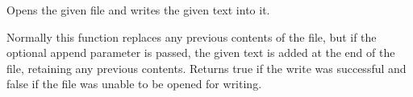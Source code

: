 Opens the given file and writes the given text into it. 

Normally this function replaces any previous contents of the file, but if the optional \textquotesingle{}append\textquotesingle{} parameter is passed, the given text is added at the end of the file, retaining any previous contents. Returns true if the write was successful and false if the file was unable to be opened for writing. 